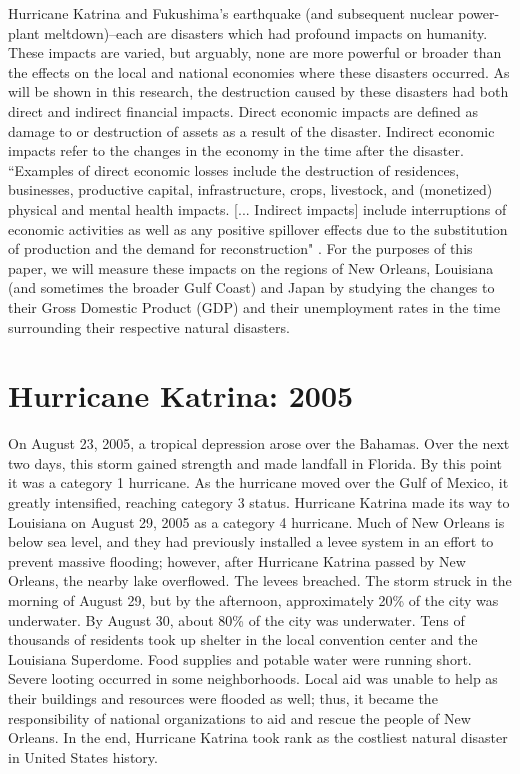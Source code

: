 \documentclass[%
 reprint,
 amsmath,amssymb,
 aps,
]{revtex4-1}
\begin{document}
Hurricane Katrina and Fukushima's earthquake (and subsequent nuclear power-plant meltdown)--each are disasters which had profound impacts on humanity. These impacts are varied, but arguably, none are more powerful or broader than the effects on the local and national economies where these disasters occurred. As will be shown in this research, the destruction caused by these disasters had both direct and indirect financial impacts. Direct economic impacts are defined as damage to or destruction of assets as a result of the disaster. Indirect economic impacts refer to the changes in the economy in the time after the disaster. ``Examples of direct economic losses include the destruction of residences, businesses, productive capital, infrastructure, crops, livestock, and (monetized) physical and mental health impacts. [... Indirect impacts] include interruptions of economic activities as well as any positive spillover effects due to the substitution of production and the demand for reconstruction" \cite{BotzenPaper}. For the purposes of this paper, we will measure these impacts on the regions of New Orleans, Louisiana (and sometimes the broader Gulf Coast) and Japan by studying the changes to their Gross Domestic Product (GDP) and their unemployment rates in the time surrounding their respective natural disasters.

\section{\label{sec:level1}Hurricane Katrina: 2005}

On August 23, 2005, a tropical depression arose over the Bahamas. Over the next two days, this storm gained strength and made landfall in Florida. By this point it was a category 1 hurricane. As the hurricane moved over the Gulf of Mexico, it greatly intensified, reaching category 3 status. Hurricane Katrina made its way to Louisiana on August 29, 2005 as a category 4 hurricane. Much of New Orleans is below sea level, and they had previously installed a levee system in an effort to prevent massive flooding; however, after Hurricane Katrina passed by New Orleans, the nearby lake overflowed. The levees breached. The storm struck in the morning of August 29, but by the afternoon, approximately 20\% of the city was underwater. By August 30, about 80\% of the city was underwater. Tens of thousands of residents took up shelter in the local convention center and the Louisiana Superdome. Food supplies and potable water were running short. Severe looting occurred in some neighborhoods. Local aid was unable to help as their buildings and resources were flooded as well; thus, it became the responsibility of national organizations to aid and rescue the people of New Orleans. In the end, Hurricane Katrina took rank as the costliest natural disaster in United States history. \cite{Katrina_encyclopedia}
\end{document}
